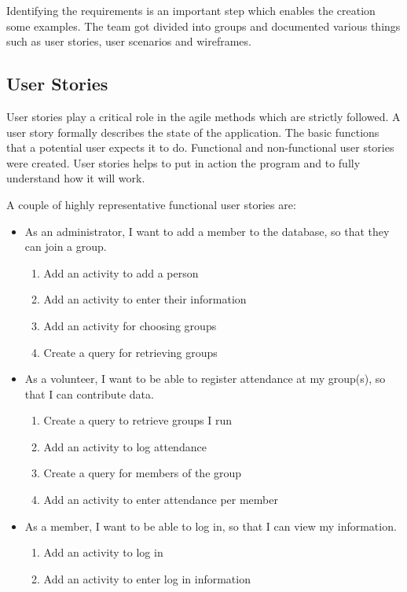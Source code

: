 \documentclass{l3proj}
\begin{document}
Identifying the requirements is an important step which enables the creation some examples. The team got divided into groups and documented various things such as user stories, user scenarios and wireframes.

\subsection{User Stories}
\label{user_stories}

User stories \cite{UserStories} play a critical role in the agile methods which are strictly followed. A user story formally describes the state of the application. The basic functions that a potential user expects it to do. Functional and non-functional user stories were created. User stories helps to put in action the program and to fully understand how it will work.

A couple of highly representative functional user stories are:
\begin{itemize}

\item As an administrator, I want to add a member to the database, so that they can join a group.

	\begin{enumerate}
	\item Add an activity to add a person
	
	\item Add an activity to enter their information

	\item Add an activity for choosing groups

	\item Create a query for retrieving groups
	\end{enumerate}
\item As a volunteer, I want to be able to register attendance at my group(s), so that I can contribute data.

	\begin{enumerate}
	\item Create a query to retrieve groups I run
	
	\item Add an activity to log attendance
	
	\item Create a query for members of the group
	
	\item Add an activity to enter attendance per member
	
	\end{enumerate}

\item As a member, I want to be able to log in, so that I can view my information.

	\begin{enumerate}
	
	\item Add an activity to log in
	\item Add an activity to enter log in information
	
	\end{enumerate}

\end{itemize}
\end{document}
